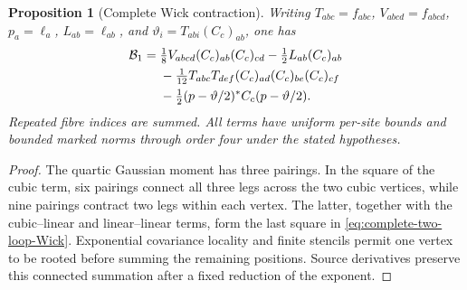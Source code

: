 \documentclass[11pt,oneside,openany]{book}
\newtheorem{proposition}[proposition]{Proposition}
\theoremstyle{definition}
\theoremstyle{remark}
\begin{document}
\begin{proposition}[Complete Wick contraction]
\label{prop:two-loop-Wick}
Writing $T_{abc}=f_{abc}$, $V_{abcd}=f_{abcd}$,
$p_a=\ell_a$, $L_{ab}=\ell_{ab}$, and
$\vartheta_i=T_{abi}(C_c)_{ab}$, one has
\begin{align}
 \mathcal B_1={}&\tfrac18V_{abcd}(C_c)_{ab}(C_c)_{cd}
             -\tfrac12L_{ab}(C_c)_{ab}\notag\\
 &-\tfrac1{12}T_{abc}T_{def}
                  (C_c)_{ad}(C_c)_{be}(C_c)_{cf}\notag\\
 &-\tfrac12(p-\vartheta/2)^*C_c(p-\vartheta/2).
 \label{eq:complete-two-loop-Wick}
\end{align}
Repeated fibre indices are summed. All terms have uniform per-site
bounds and bounded marked norms through order four under the stated
hypotheses.
\end{proposition}
\begin{proof}
The quartic Gaussian moment has three pairings. In the square of the
cubic term, six pairings connect all three legs across the two cubic
vertices, while nine pairings contract two legs within each vertex.
The latter, together with the cubic--linear and linear--linear terms,
form the last square in \cref{eq:complete-two-loop-Wick}. Exponential
covariance locality and finite stencils permit one vertex to be rooted
before summing the remaining positions. Source derivatives preserve
this connected summation after a fixed reduction of the exponent.
\end{proof}
\end{document}
